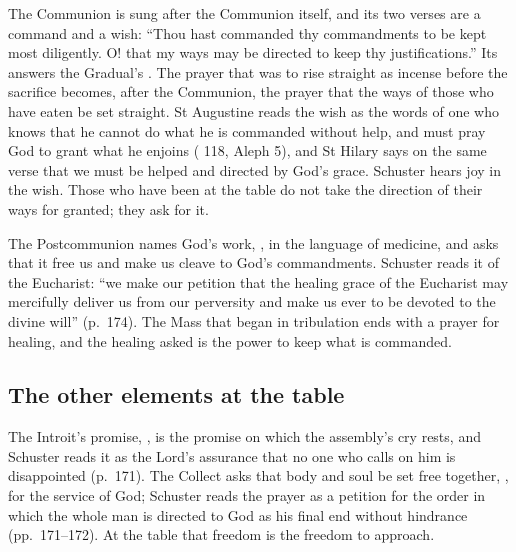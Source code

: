 The Communion is sung after the Communion itself, and its two verses are a
command and a wish: ``Thou hast commanded thy commandments to be kept most
diligently. O! that my ways may be directed to keep thy justifications.'' Its
 answers the Gradual's . The prayer that was
to rise straight as incense before the sacrifice becomes, after the Communion,
the prayer that the ways of those who have eaten be set straight. St Augustine
reads the wish as the words of one who knows that he cannot do what he is
commanded without help, and must pray God to grant what he enjoins
( 118, Aleph 5), and St Hilary says on the same verse that
we must be helped and directed by God's grace. Schuster hears joy in the wish.
Those who have been at the table do not take the direction of their ways for
granted; they ask for it.

The Postcommunion names God's work, , in
the language of medicine, and asks that it free us  and make us cleave to God's commandments. Schuster reads it of
the Eucharist: ``we make our petition that the healing grace of the Eucharist
may mercifully deliver us from our perversity and make us ever to be devoted
to the divine will'' (p.~174). The Mass that began in tribulation ends with a
prayer for healing, and the healing asked is the power to keep what is
commanded.

\subsection{The other elements at the table}

The Introit's promise, , is the promise on which the assembly's cry rests, and Schuster
reads it as the Lord's assurance that no one who calls on him is disappointed
(p.~171). The Collect asks that body and soul be set free together,
, for the service of God; Schuster reads the
prayer as a petition for the order in which the whole man is directed to God
as his final end without hindrance (pp.~171--172). At the table that freedom
is the freedom to approach.

